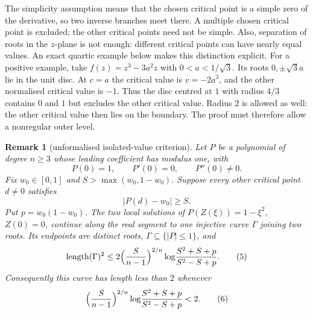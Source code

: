 \documentclass[11pt]{article}
\newtheorem{remark}[theorem]{Remark}
\begin{document}
The simplicity assumption means that the chosen critical point is a simple
zero of the derivative, so two inverse branches meet there. A multiple
chosen critical point is excluded; the other critical points need not be
simple. Also, separation of roots in the $z$-plane
is not enough: different critical points can have nearly equal values.
An exact quartic example below makes this distinction explicit.
For a positive example, take $f(z)=z^3-3a^2z$ with $0<a<1/\sqrt3$.
Its roots $0,\pm\sqrt3a$ lie in the unit disc. At $c=a$ the critical
value is $v=-2a^3$, and the other normalised critical value is $-1$.
Thus the disc centred at $1$ with radius $4/3$ contains $0$ and $1$
but excludes the other critical value. Radius $2$ is allowed as well:
the other critical value then lies on the boundary. The proof must
therefore allow a nonregular outer level.

\begin{remark}[unformalised isolated-value criterion]
\label{res:critical-value-separation}
Let $P$ be a polynomial of degree $n\ge3$ whose leading coefficient has
modulus one, with
\[
 P(0)=1,\qquad P'(0)=0,\qquad P''(0)\ne0.
\]
Fix $w_0\in[0,1]$ and $S>\max(w_0,1-w_0)$.  Suppose every other critical
point $d\ne0$ satisfies
\[
 |P(d)-w_0|\ge S.                                      \tag{4}
\]
Put $p=w_0(1-w_0)$.  The two local solutions of
$P(Z(\xi))=1-\xi^2$, $Z(0)=0$, continue along the real segment to one
injective curve $\Gamma$ joining two roots.  Its endpoints are distinct roots,
$\Gamma\subseteq\{|P|\le1\}$, and
\begin{equation*}\label{eq:disk-family-length}
 \operatorname{length}(\Gamma)^2
 \le 2\Bigl(\frac{S}{n-1}\Bigr)^{2/n}
 \log\!\frac{S^2+S+p}{S^2-S+p}.                       \tag{5}
\end{equation*}
Consequently this curve has length less than $2$ whenever
\begin{equation*}\label{eq:disk-family-coefficient}
 \Bigl(\frac{S}{n-1}\Bigr)^{2/n}
 \log\!\frac{S^2+S+p}{S^2-S+p}<2.                    \tag{6}
\end{equation*}
\end{remark}
\end{document}
